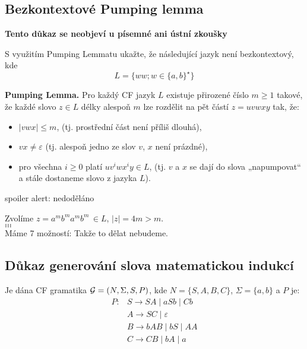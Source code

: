 \subsection{Bezkontextové Pumping lemma}
\textbf{Tento důkaz se neobjeví u písemné ani ústní zkoušky}

S využitím Pumping Lemmatu ukažte, že následující jazyk není bezkontextový, kde $$L = \{ww; w \in\{a,b\}^{\star}\}$$


\textbf{Pumping Lemma.} Pro každý CF jazyk $L$ existuje přirozené číslo $m \geq 1$ takové, že každé slovo $z \in L$
délky alespoň $m$ lze rozdělit na pět částí $z = uvwxy$ tak, že:

\begin{itemize}[label=\textbullet]
    \item $\lvert vwx \rvert \leq m$, (tj. prostřední část není příliš dlouhá),
    \item $vx \neq \varepsilon$ (tj. alespoň jedno ze slov $v$, $x$ není prázdné),
    \item pro všechna $i \geq 0$ platí $uv^i wx^i y \in L$, (tj. $v$ a $x$ se dají do slova „napumpovat“ a stále
    dostaneme slovo z jazyka $L$).
\end{itemize}

spoiler alert: nedoděláno

Zvolíme $z = a^m b^m a^m b^m \, \in L$, $|z| = 4m > m$. \\
$\dots$\\
$\dots$\\
$\dots$\\

Máme 7 možností:
Takže to dělat nebudeme.


\subsection{Důkaz generování slova matematickou indukcí} %
Je dána CF gramatika $\mathcal{G} = (N, \Sigma, S, P)$, kde $N = \{S, A, B, C\}$, $\Sigma = \{a, b\}$ a $P$ je:
\begin{align*}
    P: & S \rightarrow SA \mid aSb \mid Cb \\
       & A \rightarrow SC \mid \varepsilon \\
       & B \rightarrow bAB \mid bS \mid AA \\
       & C \rightarrow CB \mid bA \mid a \\
\end{align*}

